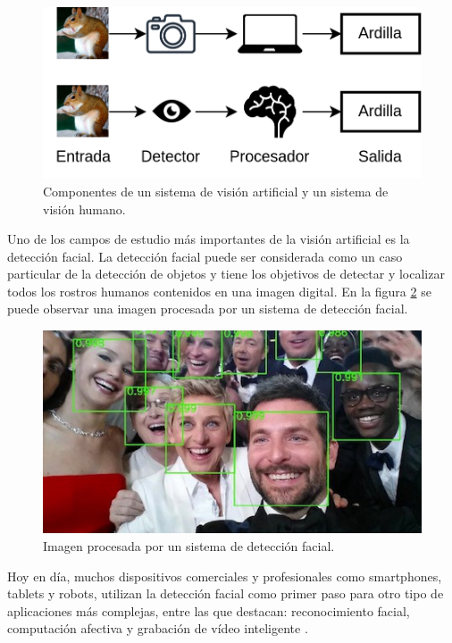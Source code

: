 \begin{figure}[h]
	\centering
	\includegraphics[scale=0.3]{./Figures/mv_comp.png}
	\caption{Componentes de un sistema de visión artificial y un sistema de visión humano.}
	\label{fig:mv_comp}
\end{figure}

Uno de los campos de estudio más importantes de la visión artificial es la detección facial. La detección facial puede ser considerada como un caso particular de la detección de objetos y tiene los objetivos de detectar y localizar todos los rostros humanos contenidos en una imagen digital. En la figura \ref{fig:mv_fd} se puede observar una imagen procesada por un sistema de detección facial.

\begin{figure}[h]
	\centering
	\includegraphics[scale=0.5]{./Figures/mv_fd.jpeg}
	\caption{Imagen procesada por un sistema de detección facial\protect\footnotemark.}
	\label{fig:mv_fd}
\end{figure}

Hoy en día, muchos dispositivos comerciales y profesionales como smartphones, tablets y robots, utilizan la detección facial como primer paso para otro tipo de aplicaciones más complejas, entre las que destacan: reconocimiento facial, computación afectiva y grabación de vídeo inteligente \cite{fd_apps}.

